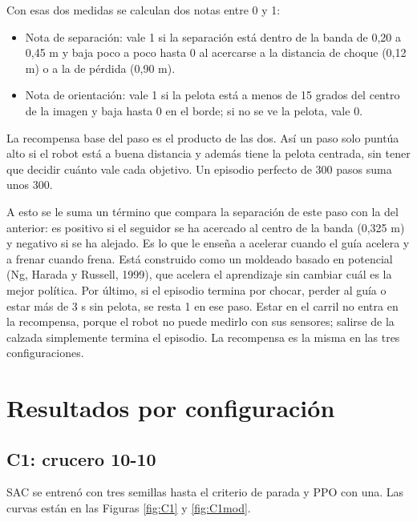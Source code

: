 \documentclass[11pt,a4paper]{article}
\begin{document}
Con esas dos medidas se calculan dos notas entre 0 y 1:
\begin{itemize}
\item Nota de separación: vale 1 si la separación está dentro de la banda de 0,20 a 0,45 m y baja poco a poco
hasta 0 al acercarse a la distancia de choque (0,12 m) o a la de pérdida (0,90 m).
\item Nota de orientación: vale 1 si la pelota está a menos de 15 grados del centro de la imagen y baja hasta 0
en el borde; si no se ve la pelota, vale 0.
\end{itemize}
La recompensa base del paso es el producto de las dos. Así un paso solo puntúa alto si el robot está a buena
distancia y además tiene la pelota centrada, sin tener que decidir cuánto vale cada objetivo. Un episodio
perfecto de 300 pasos suma unos 300.

A esto se le suma un término que compara la separación de este paso con la del anterior: es positivo si el
seguidor se ha acercado al centro de la banda (0,325 m) y negativo si se ha alejado. Es lo que le enseña a
acelerar cuando el guía acelera y a frenar cuando frena. Está construido como un moldeado basado en potencial
(Ng, Harada y Russell, 1999), que acelera el aprendizaje sin cambiar cuál es la mejor política. Por último, si
el episodio termina por chocar, perder al guía o estar más de 3 s sin pelota, se resta 1 en ese paso. Estar en el
carril no entra en la recompensa, porque el robot no puede medirlo con sus sensores; salirse de la calzada
simplemente termina el episodio. La recompensa es la misma en las tres configuraciones.

\section{Resultados por configuración}

\subsection{C1: crucero 10-10}
SAC se entrenó con tres semillas hasta el criterio de parada y PPO con una. Las curvas están en las Figuras
\ref{fig:C1} y \ref{fig:C1mod}.
\end{document}
